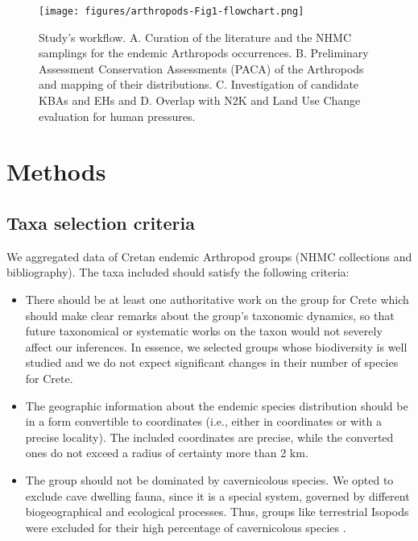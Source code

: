    \begin{figure}[ht]
      \centering
      \texttt{[image: figures/arthropods-Fig1-flowchart.png]}
      \caption[The study's workflow]{Study’s workflow. A. Curation of the literature and the NHMC samplings for the endemic Arthropods occurrences. B. Preliminary Assessment Conservation Assessments (PACA) of the Arthropods and mapping of their distributions. C. Investigation of candidate KBAs and EHs and D. Overlap with N2K and Land Use Change evaluation for human pressures.}
      \label{fig:arthropods-fig1}
   \end{figure}

\section{Methods}
\label{sec:arthropods-method}
   
    \subsection{Taxa selection criteria}
    \label{subsec:arthropods-taxa-selection}

We aggregated data of Cretan endemic Arthropod groups (NHMC collections and bibliography). The taxa included should satisfy the following criteria:
\begin{itemize}

    \item There should be at least one authoritative work on the group for Crete which
should make clear remarks about the group’s taxonomic dynamics, so that future
taxonomical or systematic works on the taxon would not severely affect our inferences.
In essence, we selected groups whose biodiversity is well studied and we do not
expect significant changes in their number of species for Crete. 

    \item The geographic information about the endemic species distribution should be in
a form convertible to coordinates (i.e., either in coordinates or with a
precise locality). The included coordinates are precise, while the converted
ones do not exceed a radius of certainty more than 2 km.

    \item The group should not be dominated by cavernicolous species. We opted to exclude
cave dwelling fauna, since it is a special system, governed by different
biogeographical and ecological processes. Thus, groups like terrestrial Isopods
were excluded for their high percentage of cavernicolous species \parencite{schmalfuss2004the-terrestrial,sfendourakis2018}.

\end{itemize}

